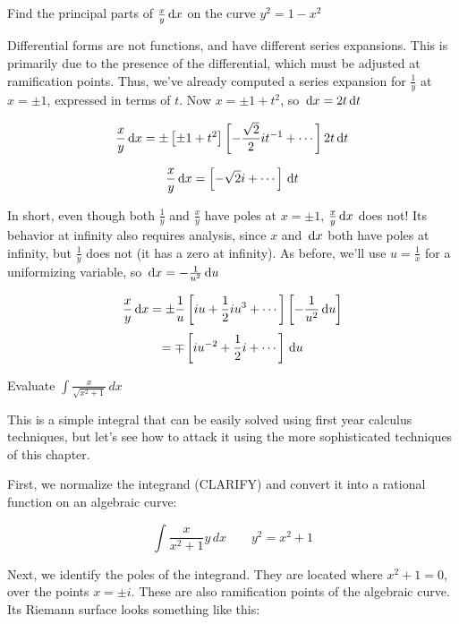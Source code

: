 \example Find the principal parts of $\frac{x}{y} \,\mathrm{d} x$ on the curve
$y^2 = 1 - x^2$

Differential forms are not functions, and have different series
expansions.  This is primarily due to the presence of the
differential, which must be adjusted at ramification points.  Thus,
we've already computed a series expansion for $\frac{1}{y}$ at $x=\pm
1$, expressed in terms of $t$.  Now $x=\pm 1 + t^2$, so $\,\mathrm{d} x=2t\,\mathrm{d}
t$

$$\frac{x}{y} \,\mathrm{d} x = \pm \left[\pm 1 + t^2 \right] \left[ -\frac{\sqrt{2}}{2} it^{-1} + \cdots \right] 2t \,\mathrm{d} t$$

$$\frac{x}{y} \,\mathrm{d} x = \left[ -\sqrt{2} i + \cdots \right] \,\mathrm{d} t$$

In short, even though both $\frac{1}{y}$ and $\frac{x}{y}$ have poles
at $x=\pm 1$, $\frac{x}{y} \,\mathrm{d} x$ does not!  Its behavior at infinity
also requires analysis, since $x$ and $\,\mathrm{d} x$ both have poles at
infinity, but $\frac{1}{y}$ does not (it has a zero at infinity).
As before, we'll use $u=\frac{1}{x}$ for a uniformizing variable,
so $\,\mathrm{d} x = -\frac{1}{u^2} \,\mathrm{d} u$

$$\frac{x}{y} \,\mathrm{d} x = \pm \frac{1}{u} \left[ i u + \frac{1}{2} i u^3 + \cdots \right] \left[-\frac{1}{u^2} \,\mathrm{d} u\right]$$
$$ = \mp \left[ i u^{-2} + \frac{1}{2} i + \cdots \right] \,\mathrm{d} u$$


\endexample

\example Evaluate $\int \frac{x}{\sqrt{x^2+1}}\,dx$

This is a simple integral that can be easily solved using first year
calculus techniques, but let's see how to attack it using the more
sophisticated techniques of this chapter.

First, we normalize the integrand (CLARIFY) and convert it into
a rational function on an algebraic curve:

$$\int \frac{x}{x^2+1}y\,dx\qquad y^2=x^2+1$$

Next, we identify the poles of the integrand.  They are located
where $x^2+1=0$, over the points $x=\pm i$.  These are also
ramification points of the algebraic curve.  Its Riemann surface
looks something like this:


